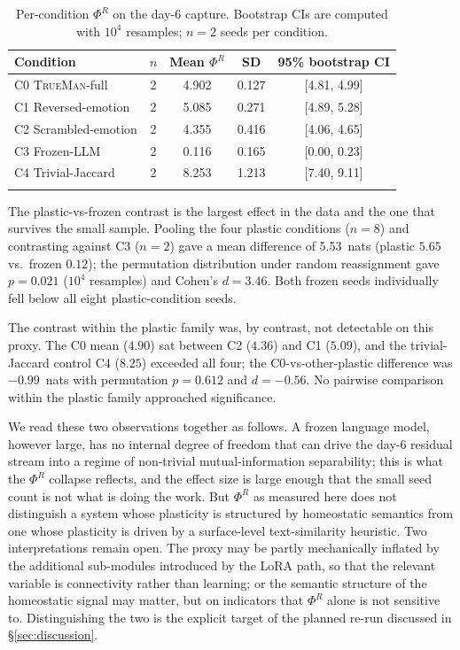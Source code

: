 \documentclass[pdflatex,sn-mathphys-num]{sn-jnl}
\newcommand{\TrueMan}{\textsc{TrueMan}}
\theoremstyle{thmstyleone}
\theoremstyle{thmstylethree}
\begin{document}
\begin{table}[h]
\caption{Per-condition $\Phi^R$ on the day-6 capture. Bootstrap CIs are computed with $10^4$ resamples; $n=2$ seeds per condition.}
\label{tab:phi_r}
\small
\begin{tabular}{@{}lcccc@{}}
\toprule
Condition & $n$ & Mean $\Phi^R$ & SD & 95\% bootstrap CI \\
\midrule
C0 \TrueMan{}-full   & 2 & 4.902 & 0.127 & [4.81, 4.99] \\
C1 Reversed-emotion  & 2 & 5.085 & 0.271 & [4.89, 5.28] \\
C2 Scrambled-emotion & 2 & 4.355 & 0.416 & [4.06, 4.65] \\
C3 Frozen-LLM        & 2 & 0.116 & 0.165 & [0.00, 0.23] \\
C4 Trivial-Jaccard   & 2 & 8.253 & 1.213 & [7.40, 9.11] \\
\botrule
\end{tabular}
\end{table}

The plastic-vs-frozen contrast is the largest effect in the data and the one that survives the small sample. Pooling the four plastic conditions ($n=8$) and contrasting against C3 ($n=2$) gave a mean difference of 5.53~nats (plastic $5.65$ vs.\ frozen $0.12$); the permutation distribution under random reassignment gave $p = 0.021$ ($10^4$ resamples) and Cohen's $d = 3.46$. Both frozen seeds individually fell below all eight plastic-condition seeds.

The contrast within the plastic family was, by contrast, not detectable on this proxy. The C0 mean ($4.90$) sat between C2 ($4.36$) and C1 ($5.09$), and the trivial-Jaccard control C4 ($8.25$) exceeded all four; the C0-vs-other-plastic difference was $-0.99$~nats with permutation $p = 0.612$ and $d = -0.56$. No pairwise comparison within the plastic family approached significance.

We read these two observations together as follows. A frozen language model, however large, has no internal degree of freedom that can drive the day-6 residual stream into a regime of non-trivial mutual-information separability; this is what the $\Phi^R$ collapse reflects, and the effect size is large enough that the small seed count is not what is doing the work. But $\Phi^R$ as measured here does not distinguish a system whose plasticity is structured by homeostatic semantics from one whose plasticity is driven by a surface-level text-similarity heuristic. Two interpretations remain open. The proxy may be partly mechanically inflated by the additional sub-modules introduced by the LoRA path, so that the relevant variable is connectivity rather than learning; or the semantic structure of the homeostatic signal may matter, but on indicators that $\Phi^R$ alone is not sensitive to. Distinguishing the two is the explicit target of the planned re-run discussed in \S\ref{sec:discussion}.
\end{document}
